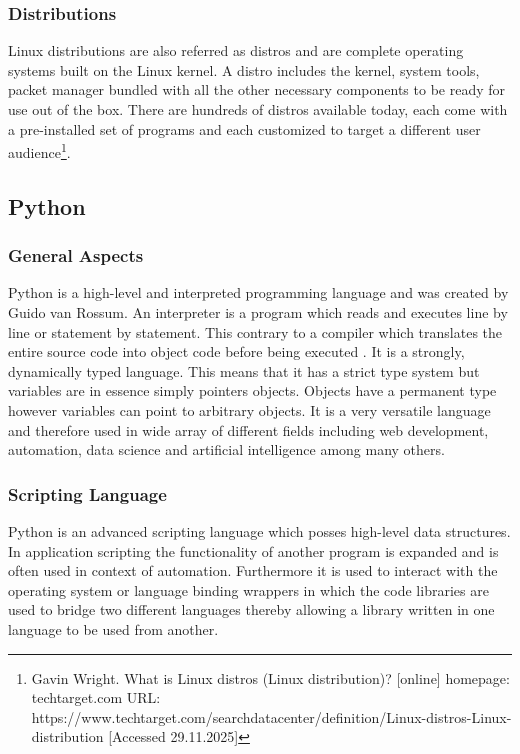 \subsubsection{Distributions}

Linux distributions are also referred as distros and are complete operating systems built on the Linux kernel. A distro includes the kernel, system tools, packet manager bundled with all the other necessary components to be ready for use out of the box. There are hundreds of distros available today, each come with a pre-installed set of programs and each customized to target a different user audience\footnote{Gavin Wright. What is Linux distros (Linux distribution)? [online] homepage: techtarget.com URL: https://www.techtarget.com/searchdatacenter/definition/Linux-distros-Linux-distribution [Accessed 29.11.2025]}.

\subsection{Python}

\subsubsection{General Aspects}

Python is a high-level and interpreted programming language and was created by Guido van Rossum. An interpreter is a program which reads and executes line by line or statement by statement. This contrary to a compiler which translates the entire source code into object code before being executed \cite{downey2012}.  \newline\newline It is a strongly, dynamically typed language. This means that it has a strict type system but variables are in essence simply pointers objects. Objects have a permanent type however variables can point to arbitrary objects.  It is a very versatile language and therefore used in wide array of different fields including web development, automation, data science and artificial intelligence among many others. 

\subsubsection{Scripting Language}

Python is an advanced scripting language which posses high-level data structures. In application scripting the functionality of another program is expanded and is often used in context of automation. Furthermore it is used to interact with the operating system or language binding wrappers in which the code libraries are used to bridge two different languages thereby allowing a library written in one language to be used from another.


